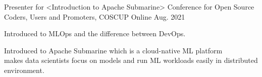 

\begin{cventries}

  \cventry
    {Presenter for <Introduction to Apache Submarine>} %
    {Conference for Open Source Coders, Users and Promoters, COSCUP} %
    {Online} %
    {Aug. 2021} %
    {
      \begin{cvitems} %
        \item {Introduced to MLOps and the difference between DevOps.}
        \item {Introduced to Apache Submarine which is a cloud-native ML platform \\ makes data scientists focus on models and run ML workloads easily in distributed environment.}
      \end{cvitems}
    }
\end{cventries}
